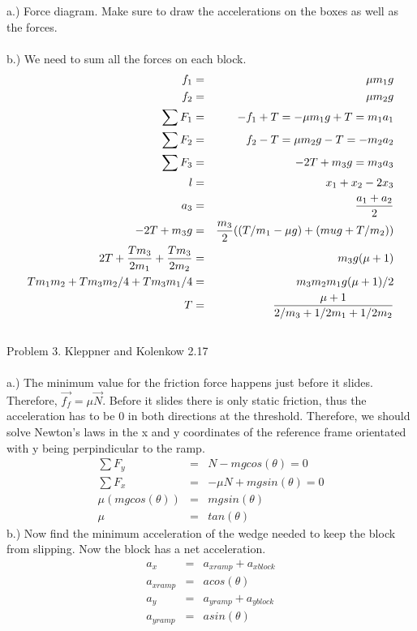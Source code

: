 \documentclass[11pt]{amsart}
\begin{document}
a.) Force diagram. Make sure to draw the accelerations on the boxes as well as the forces. \\ \\
b.) We need to sum all the forces on each block. \\
\begin{eqnarray*}
f_{1} &=& \mu{m_{1}g} \\
f_{2} &=& \mu{m_{2}g} \\
\sum{F_{1}} &=&  -f_{1} + T =   -\mu{m_{1}g} +T = m_{1}a_{1} \\
\sum{F_{2}} &=&  f_{2} - T =   \mu{m_{2}g} -T = -m_{2}a_{2} \\
\sum{F_{3}} &=& -2T+m_{3}g = m_{3}a_{3} \\
l &=& x_{1} + x_{2} -2x_{3} \\
a_{3} &=& \frac{a_{1}+a_{2}}{2} \\
-2T+m_{3}g &=& \frac{m_{3}}{2}((T/m_{1}-\mu{g})+(\-mu{g} +T/m_{2})) \\
2T +\frac{Tm_{3}}{2m_{1}} +\frac{Tm_{3}}{2m_{2}} &=& m_{3}g(\mu+1) \\
Tm_{1}m_{2} +Tm_{3}m_{2}/4 +Tm_{3}m_{1}/4 &=& m_{3}m_{2}m_{1}g(\mu+1)/2 \\
T &=& \frac{\mu+1}{2/m_{3} + 1/2m_{1} + 1/2m_{2}} 
\end{eqnarray*} \\
Problem 3. Kleppner and Kolenkow 2.17 \\ \\
a.) The minimum value for the friction force happens just before it slides. Therefore, $\vec{f_{f}}=\mu\vec{N}$. Before it slides there is only static friction, thus the acceleration has to be 0 in both directions at the threshold. Therefore, we should solve Newton's laws in the x and y coordinates of the reference frame orientated with y being perpindicular to the ramp. \\
\begin{eqnarray*} 
\sum{F_{y}} &=& N-mgcos(\theta) = 0 \\
\sum{F_{x}} &=& -\mu{N}+mgsin(\theta) = 0 \\
\mu(mgcos(\theta))&=&mgsin(\theta) \\
\mu &=& tan(\theta) 
\end{eqnarray*}
b.) Now find the minimum acceleration of the wedge needed to keep the block from slipping. Now the block has a net acceleration. \\ 
\begin{eqnarray*} 
a_{x} &=& a_{xramp} + a_{xblock} \\
a_{xramp} &=& acos(\theta) \\
a_{y} &=& a_{yramp} + a_{yblock} \\
a_{yramp} &=& asin(\theta) 
\end{eqnarray*} \\
\end{document}
